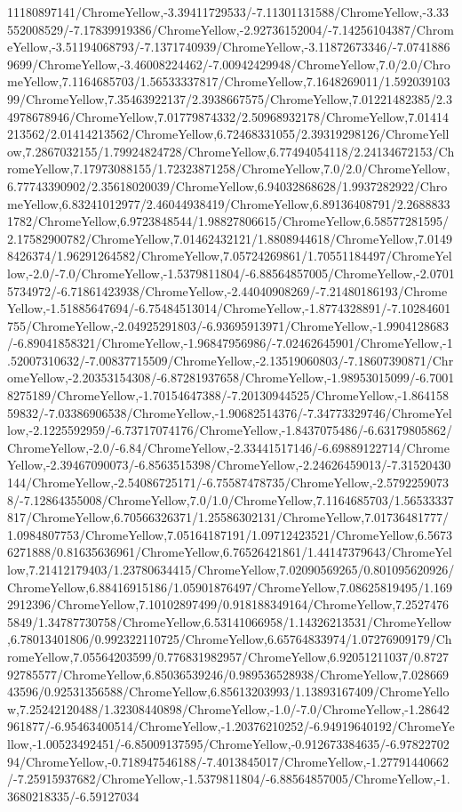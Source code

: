 {\begin{tikzternal}
11180897141/ChromeYellow,-3.39411729533/-7.11301131588/ChromeYellow,-3.33552008529/-7.17839919386/ChromeYellow,-2.92736152004/-7.14256104387/ChromeYellow,-3.51194068793/-7.1371740939/ChromeYellow,-3.11872673346/-7.07418869699/ChromeYellow,-3.46008224462/-7.00942429948/ChromeYellow,7.0/2.0/ChromeYellow,7.1164685703/1.56533337817/ChromeYellow,7.1648269011/1.59203910399/ChromeYellow,7.35463922137/2.3938667575/ChromeYellow,7.01221482385/2.34978678946/ChromeYellow,7.01779874332/2.50968932178/ChromeYellow,7.01414213562/2.01414213562/ChromeYellow,6.72468331055/2.39319298126/ChromeYellow,7.2867032155/1.79924824728/ChromeYellow,6.77494054118/2.24134672153/ChromeYellow,7.17973088155/1.72323871258/ChromeYellow,7.0/2.0/ChromeYellow,6.77743390902/2.35618020039/ChromeYellow,6.94032868628/1.9937282922/ChromeYellow,6.83241012977/2.46044938419/ChromeYellow,6.89136408791/2.26888331782/ChromeYellow,6.9723848544/1.98827806615/ChromeYellow,6.58577281595/2.17582900782/ChromeYellow,7.01462432121/1.8808944618/ChromeYellow,7.01498426374/1.96291264582/ChromeYellow,7.05724269861/1.70551184497/ChromeYellow,-2.0/-7.0/ChromeYellow,-1.5379811804/-6.88564857005/ChromeYellow,-2.07015734972/-6.71861423938/ChromeYellow,-2.44040908269/-7.21480186193/ChromeYellow,-1.51885647694/-6.75484513014/ChromeYellow,-1.8774328891/-7.10284601755/ChromeYellow,-2.04925291803/-6.93695913971/ChromeYellow,-1.9904128683/-6.89041858321/ChromeYellow,-1.96847956986/-7.02462645901/ChromeYellow,-1.52007310632/-7.00837715509/ChromeYellow,-2.13519060803/-7.18607390871/ChromeYellow,-2.20353154308/-6.87281937658/ChromeYellow,-1.98953015099/-6.70018275189/ChromeYellow,-1.70154647388/-7.20130944525/ChromeYellow,-1.86415859832/-7.03386906538/ChromeYellow,-1.90682514376/-7.34773329746/ChromeYellow,-2.1225592959/-6.73717074176/ChromeYellow,-1.8437075486/-6.63179805862/ChromeYellow,-2.0/-6.84/ChromeYellow,-2.33441517146/-6.69889122714/ChromeYellow,-2.39467090073/-6.8563515398/ChromeYellow,-2.24626459013/-7.31520430144/ChromeYellow,-2.54086725171/-6.75587478735/ChromeYellow,-2.57922590738/-7.12864355008/ChromeYellow,7.0/1.0/ChromeYellow,7.1164685703/1.56533337817/ChromeYellow,6.70566326371/1.25586302131/ChromeYellow,7.01736481777/1.0984807753/ChromeYellow,7.05164187191/1.09712423521/ChromeYellow,6.56736271888/0.81635636961/ChromeYellow,6.76526421861/1.44147379643/ChromeYellow,7.21412179403/1.23780634415/ChromeYellow,7.02090569265/0.801095620926/ChromeYellow,6.88416915186/1.05901876497/ChromeYellow,7.08625819495/1.1692912396/ChromeYellow,7.10102897499/0.918188349164/ChromeYellow,7.25274765849/1.34787730758/ChromeYellow,6.53141066958/1.14326213531/ChromeYellow,6.78013401806/0.992322110725/ChromeYellow,6.65764833974/1.07276909179/ChromeYellow,7.05564203599/0.776831982957/ChromeYellow,6.92051211037/0.872792785577/ChromeYellow,6.85036539246/0.989536528938/ChromeYellow,7.02866943596/0.92531356588/ChromeYellow,6.85613203993/1.13893167409/ChromeYellow,7.25242120488/1.32308440898/ChromeYellow,-1.0/-7.0/ChromeYellow,-1.28642961877/-6.95463400514/ChromeYellow,-1.20376210252/-6.94919640192/ChromeYellow,-1.00523492451/-6.85009137595/ChromeYellow,-0.912673384635/-6.9782270294/ChromeYellow,-0.718947546188/-7.4013845017/ChromeYellow,-1.27791440662/-7.25915937682/ChromeYellow,-1.5379811804/-6.88564857005/ChromeYellow,-1.3680218335/-6.59127034
\end{tikzternal}}
